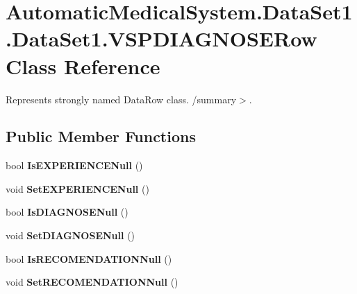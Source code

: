 \section{AutomaticMedicalSystem.DataSet1.DataSet1.VSPDIAGNOSERow Class Reference}
\label{class_automatic_medical_system_1_1_data_set1_1_1_v_s_p_d_i_a_g_n_o_s_e_row}
Represents strongly named DataRow class. /summary$>$.  


\subsection*{Public Member Functions}
\begin{CompactItemize}
\item 
bool \textbf{IsEXPERIENCENull} ()\label{class_automatic_medical_system_1_1_data_set1_1_1_v_s_p_d_i_a_g_n_o_s_e_row_90feebb42d298be774feaa8b126d4e51}

\item 
void \textbf{SetEXPERIENCENull} ()\label{class_automatic_medical_system_1_1_data_set1_1_1_v_s_p_d_i_a_g_n_o_s_e_row_b9702a5f93c6a858c0c014be181e79e4}

\item 
bool \textbf{IsDIAGNOSENull} ()\label{class_automatic_medical_system_1_1_data_set1_1_1_v_s_p_d_i_a_g_n_o_s_e_row_c1727bb1409f6d0f204a66c22b0fc648}

\item 
void \textbf{SetDIAGNOSENull} ()\label{class_automatic_medical_system_1_1_data_set1_1_1_v_s_p_d_i_a_g_n_o_s_e_row_5898e6823490658956b81b87d77ae137}

\item 
bool \textbf{IsRECOMENDATIONNull} ()\label{class_automatic_medical_system_1_1_data_set1_1_1_v_s_p_d_i_a_g_n_o_s_e_row_20c86cda0287c33bd174ecc3767cb663}

\item 
void \textbf{SetRECOMENDATIONNull} ()\label{class_automatic_medical_system_1_1_data_set1_1_1_v_s_p_d_i_a_g_n_o_s_e_row_12343f3db295387880e8bfbbd91c5d08}

\end{CompactItemize}
